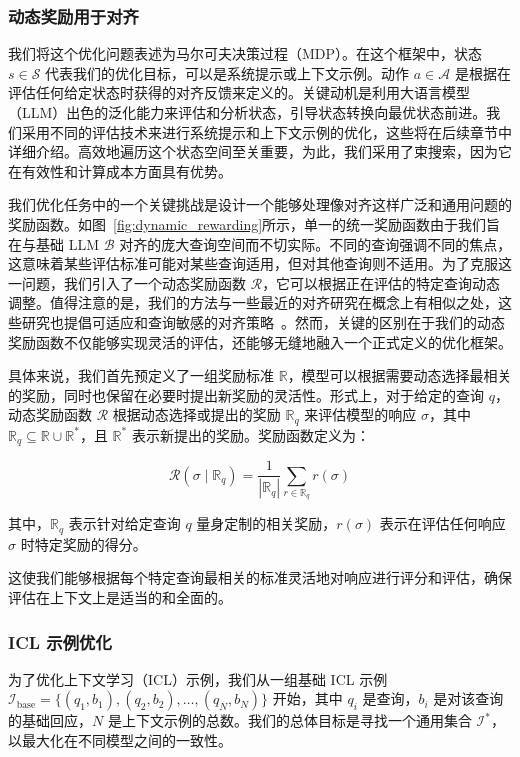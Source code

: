 \subsubsection{动态奖励用于对齐}

我们将这个优化问题表述为马尔可夫决策过程（MDP）。在这个框架中，状态 $s \in \mathcal{S}$ 代表我们的优化目标，可以是系统提示或上下文示例。动作 $a \in \mathcal{A}$ 是根据在评估任何给定状态时获得的对齐反馈来定义的。关键动机是利用大语言模型（LLM）出色的泛化能力来评估和分析状态，引导状态转换向最优状态前进。我们采用不同的评估技术来进行系统提示和上下文示例的优化，这些将在后续章节中详细介绍。高效地遍历这个状态空间至关重要，为此，我们采用了束搜索，因为它在有效性和计算成本方面具有优势。

我们优化任务中的一个关键挑战是设计一个能够处理像对齐这样广泛和通用问题的奖励函数。如图~\ref{fig:dynamic_rewarding}所示，单一的统一奖励函数由于我们旨在与基础 LLM $\mathcal{B}$ 对齐的庞大查询空间而不切实际。不同的查询强调不同的焦点，这意味着某些评估标准可能对某些查询适用，但对其他查询则不适用。为了克服这一问题，我们引入了一个动态奖励函数 $\mathcal{R}$，它可以根据正在评估的特定查询动态调整。值得注意的是，我们的方法与一些最近的对齐研究在概念上有相似之处，这些研究也提倡可适应和查询敏感的对齐策略~\cite{bai2022constitutional, sun2024principle}。然而，关键的区别在于我们的动态奖励函数不仅能够实现灵活的评估，还能够无缝地融入一个正式定义的优化框架。

具体来说，我们首先预定义了一组奖励标准 $\mathbb{R}$，模型可以根据需要动态选择最相关的奖励，同时也保留在必要时提出新奖励的灵活性。形式上，对于给定的查询 \( q \)，动态奖励函数 $\mathcal{R}$ 根据动态选择或提出的奖励 $\mathbb{R}_q$ 来评估模型的响应 $\sigma$，其中 $\mathbb{R}_q \subseteq \mathbb{R} \cup \mathbb{R}^*$，且 $\mathbb{R}^*$ 表示新提出的奖励。奖励函数定义为：

\[
\mathcal{R}(\sigma \mid \mathbb{R}_q) = \frac{1}{|\mathbb{R}_q|} \sum_{r \in \mathbb{R}_q} r(\sigma)
\]

其中，$\mathbb{R}_q$ 表示针对给定查询 \( q \) 量身定制的相关奖励，$r(\sigma)$ 表示在评估任何响应 \(\sigma\) 时特定奖励的得分。

这使我们能够根据每个特定查询最相关的标准灵活地对响应进行评分和评估，确保评估在上下文上是适当的和全面的。
\subsubsection{ICL 示例优化}

为了优化上下文学习（ICL）示例，我们从一组基础 ICL 示例 $\mathcal{I}_{\text{base}} = \{(q_1, b_1), (q_2, b_2), \ldots, (q_N, b_N)\} $ 开始，其中 $q_i$ 是查询，$b_i$ 是对该查询的基础回应，$N$ 是上下文示例的总数。我们的总体目标是寻找一个通用集合 $\mathcal{I}^{*}$，以最大化在不同模型之间的一致性。

